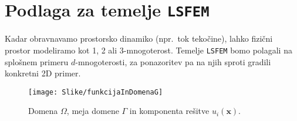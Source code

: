 \section{Podlaga za temelje \texttt{LSFEM}}

Kadar obravnavamo prostorsko dinamiko (npr.\ tok tekočine), lahko fizični prostor modeliramo kot 1, 2 ali 3-mnogoterost. Temelje \texttt{LSFEM} bomo polagali na splošnem primeru $d$-mnogoterosti, za ponazoritev pa na njih sproti gradili konkretni 2D primer.

\begin{wrapfigure}{r}{6cm}
	\vspace{-3mm}
	\centering
	\captionsetup{type=figure}
	\texttt{[image: Slike/funkcijaInDomenaG]}
	\caption{Domena $\Omega$, meja domene $\Gamma$ in komponenta rešitve $u_i(\mathbf{x})$.}
\label{fig:funkInDom}
\vspace{0.2cm}
\end{wrapfigure}


